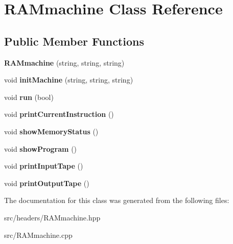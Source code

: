 \hypertarget{classRAMmachine}{\section{R\-A\-Mmachine Class Reference}
\label{classRAMmachine}
}
\subsection*{Public Member Functions}
\begin{DoxyCompactItemize}
\item 
\hypertarget{classRAMmachine_ad5ec54172e71b87c76f8a4b4d31e06bd}{{\bfseries R\-A\-Mmachine} (string, string, string)}\label{classRAMmachine_ad5ec54172e71b87c76f8a4b4d31e06bd}

\item 
\hypertarget{classRAMmachine_a42b4e5cc1c054c28011e00ab54c98bbf}{void {\bfseries init\-Machine} (string, string, string)}\label{classRAMmachine_a42b4e5cc1c054c28011e00ab54c98bbf}

\item 
\hypertarget{classRAMmachine_a4e5efa9b417958cd42f649f66e237710}{void {\bfseries run} (bool)}\label{classRAMmachine_a4e5efa9b417958cd42f649f66e237710}

\item 
\hypertarget{classRAMmachine_ade5769f9ae186bed299fa164d16ebc33}{void {\bfseries print\-Current\-Instruction} ()}\label{classRAMmachine_ade5769f9ae186bed299fa164d16ebc33}

\item 
\hypertarget{classRAMmachine_a94145ee5533985c15c38156069a7b67e}{void {\bfseries show\-Memory\-Status} ()}\label{classRAMmachine_a94145ee5533985c15c38156069a7b67e}

\item 
\hypertarget{classRAMmachine_a9d0a4de83f7bb48565f7abb370215ac0}{void {\bfseries show\-Program} ()}\label{classRAMmachine_a9d0a4de83f7bb48565f7abb370215ac0}

\item 
\hypertarget{classRAMmachine_ada124c82636c272ef71f82e5dec53a41}{void {\bfseries print\-Input\-Tape} ()}\label{classRAMmachine_ada124c82636c272ef71f82e5dec53a41}

\item 
\hypertarget{classRAMmachine_ac8fe4966b254a0663685d5d42521814c}{void {\bfseries print\-Output\-Tape} ()}\label{classRAMmachine_ac8fe4966b254a0663685d5d42521814c}

\end{DoxyCompactItemize}


The documentation for this class was generated from the following files\-:\begin{DoxyCompactItemize}
\item 
src/headers/R\-A\-Mmachine.\-hpp\item 
src/R\-A\-Mmachine.\-cpp\end{DoxyCompactItemize}

